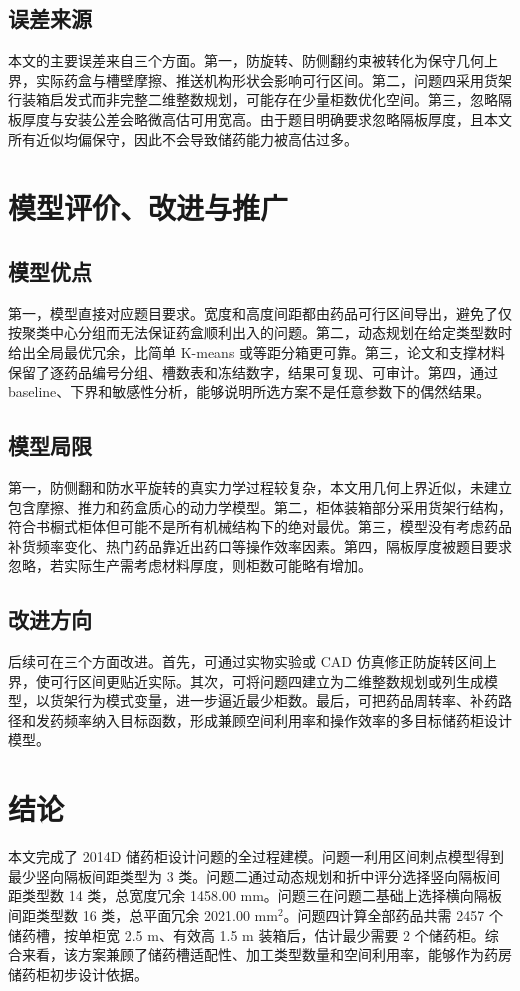 \documentclass[UTF8,a4paper,12pt]{ctexart}
\begin{document}
\subsection{误差来源}
本文的主要误差来自三个方面。第一，防旋转、防侧翻约束被转化为保守几何上界，实际药盒与槽壁摩擦、推送机构形状会影响可行区间。第二，问题四采用货架行装箱启发式而非完整二维整数规划，可能存在少量柜数优化空间。第三，忽略隔板厚度与安装公差会略微高估可用宽高。由于题目明确要求忽略隔板厚度，且本文所有近似均偏保守，因此不会导致储药能力被高估过多。

\section{模型评价、改进与推广}
\subsection{模型优点}
第一，模型直接对应题目要求。宽度和高度间距都由药品可行区间导出，避免了仅按聚类中心分组而无法保证药盒顺利出入的问题。第二，动态规划在给定类型数时给出全局最优冗余，比简单 K-means 或等距分箱更可靠。第三，论文和支撑材料保留了逐药品编号分组、槽数表和冻结数字，结果可复现、可审计。第四，通过 baseline、下界和敏感性分析，能够说明所选方案不是任意参数下的偶然结果。

\subsection{模型局限}
第一，防侧翻和防水平旋转的真实力学过程较复杂，本文用几何上界近似，未建立包含摩擦、推力和药盒质心的动力学模型。第二，柜体装箱部分采用货架行结构，符合书橱式柜体但可能不是所有机械结构下的绝对最优。第三，模型没有考虑药品补货频率变化、热门药品靠近出药口等操作效率因素。第四，隔板厚度被题目要求忽略，若实际生产需考虑材料厚度，则柜数可能略有增加。

\subsection{改进方向}
后续可在三个方面改进。首先，可通过实物实验或 CAD 仿真修正防旋转区间上界，使可行区间更贴近实际。其次，可将问题四建立为二维整数规划或列生成模型，以货架行为模式变量，进一步逼近最少柜数。最后，可把药品周转率、补药路径和发药频率纳入目标函数，形成兼顾空间利用率和操作效率的多目标储药柜设计模型。

\section{结论}
本文完成了 2014D 储药柜设计问题的全过程建模。问题一利用区间刺点模型得到最少竖向隔板间距类型为 3 类。问题二通过动态规划和折中评分选择竖向隔板间距类型数 14 类，总宽度冗余 1458.00 mm。问题三在问题二基础上选择横向隔板间距类型数 16 类，总平面冗余 2021.00 mm$^2$。问题四计算全部药品共需 2457 个储药槽，按单柜宽 2.5 m、有效高 1.5 m 装箱后，估计最少需要 2 个储药柜。综合来看，该方案兼顾了储药槽适配性、加工类型数量和空间利用率，能够作为药房储药柜初步设计依据。
\end{document}

